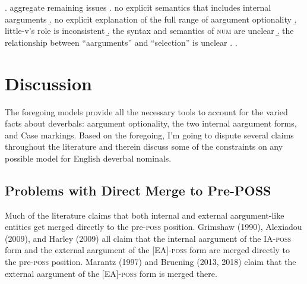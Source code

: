\documentclass[12pt]{article}
\begin{document}
\ex. \label{sumsum1} aggregate remaining issues
\a. no explicit semantics that includes internal aarguments
\b. no explicit explanation of the full range of aargument optionality
\b. little-v's role is inconsistent
\b. the syntax and semantics of \textsc{num} are unclear
\b. the relationship between ``aarguments'' and ``selection'' is unclear
\z. \z. \par \par

\doublespacing

\section{Discussion}\label{disc}

The foregoing models provide all the necessary tools to account for the varied facts about deverbals: aargument optionality, the two internal aargument forms, and Case markings. Based on the foregoing, I'm going to dispute several claims throughout the literature and therein discuss some of the  constraints on any possible model for English deverbal nominals.

\subsection{Problems with Direct Merge to Pre-POSS}\label{disc1}

Much of the literature claims that both internal and external aargument-like entities get merged directly to the pre-\textsc{poss} position. Grimshaw (1990), Alexiadou (2009), and Harley (2009) all claim that the internal aargument of the IA-\textsc{poss} form and the external aargument of the [EA]-\textsc{poss} form are merged directly to the pre-\textsc{poss} position. Marantz (1997) and Bruening (2013, 2018) claim that the external aargument of the [EA]-\textsc{poss} form is merged there. 
\end{document}
